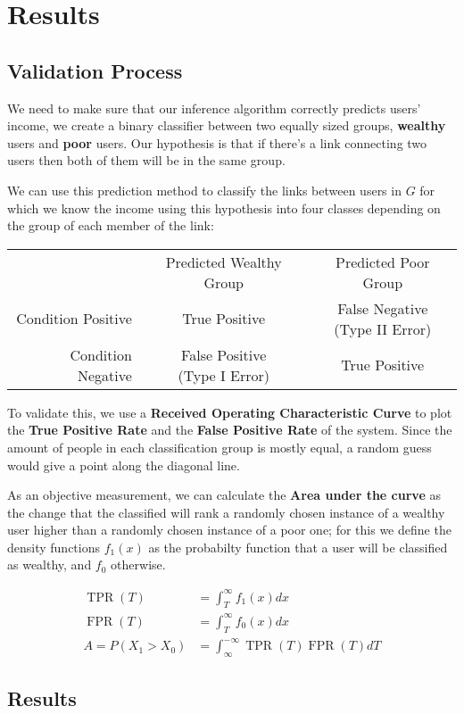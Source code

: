 \section{Results}

\subsection{Validation Process}

We need to make sure that our inference algorithm correctly predicts users' income, we create a binary classifier between two equally sized groups, \textbf{wealthy} users and \textbf{poor} users. Our hypothesis is that if there's a link connecting two users then both of them will be in the same group.

We can use this prediction method to classify the links between users in $ G $ for which we know the income using this hypothesis into four classes depending on the group of each member of the link:

\begin{tabularx}{\textwidth}{ r c c }
& Predicted Wealthy Group & Predicted Poor Group \\
Condition Positive & \cellcolor{green} True Positive & \cellcolor{red} \makecell{False Negative \\ (Type II Error)} \\ 
Condition Negative & \cellcolor{red} \makecell{False Positive \\ (Type I Error)} & \cellcolor{green} True Positive \\
\end{tabularx}

To validate this, we use a \textbf{Received Operating Characteristic Curve} to plot the \textbf{True Positive Rate} and the \textbf{False Positive Rate} of the system. Since the amount of people in each classification group is mostly equal, a random guess would give a point along the diagonal line.

As an objective measurement, we can calculate the \textbf{Area under the curve} as the change that the classified will rank a randomly chosen instance of a wealthy user higher than a randomly chosen instance of a poor one; for this we define the density functions $ f_1(x) $ as the probabilty function that a user will be classified as wealthy, and $ f_0 $ otherwise.

\begin{align*}
\operatorname{TPR}(T) &= \int^{\infty}_T f_1(x) dx \\
\operatorname{FPR}(T) &= \int^{\infty}_T f_0(x) dx \\
A = P(X_1 > X_0) &= \int^{-\infty}_{\infty} \operatorname{TPR}(T) \operatorname{FPR}(T) dT
\end{align*}

\subsection{Results}
